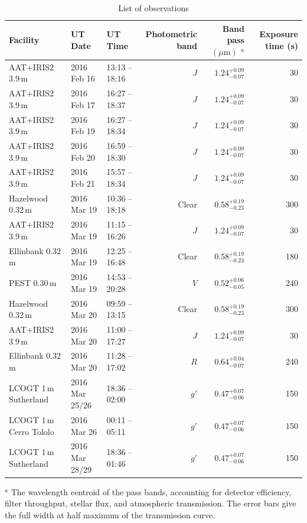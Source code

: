 \documentclass[useAMS,usenatbib]{mn2e}
\begin{document}
\begin{table}
\centering
\caption{\label{tab:observations}List of observations}
\begin{tabular}{lllrrr}
\hline\hline
Facility & UT Date & UT Time & Photometric band & Band pass $(\mu\mathrm{m})$ $^a$& Exposure time (s) \\
\hline
AAT+IRIS2 3.9\,m & 2016 Feb 16 & 13:13 -- 18:16 & $J$ & $1.24_{-0.07}^{+0.09}$ & 30 \\
AAT+IRIS2 3.9\,m & 2016 Feb 17 & 16:27 -- 18:37 & $J$ & $1.24_{-0.07}^{+0.09}$ & 30 \\
AAT+IRIS2 3.9\,m & 2016 Feb 19 & 16:27 -- 18:34 & $J$ & $1.24_{-0.07}^{+0.09}$ & 30 \\
AAT+IRIS2 3.9\,m & 2016 Feb 20 & 16:59 -- 18:30 & $J$ & $1.24_{-0.07}^{+0.09}$ & 30 \\
AAT+IRIS2 3.9\,m & 2016 Feb 21 & 15:57 -- 18:34 & $J$ & $1.24_{-0.07}^{+0.09}$ & 30 \\
Hazelwood 0.32\,m & 2016 Mar 19 & 10:36 -- 18:18 & Clear & $0.58_{-0.23}^{+0.19}$ & 300 \\
AAT+IRIS2 3.9\,m & 2016 Mar 19 & 11:15 -- 16:26 & $J$ & $1.24_{-0.07}^{+0.09}$ & 30 \\
Ellinbank 0.32\,m & 2016 Mar 19 & 12:25 -- 16:48 & Clear & $0.58_{-0.23}^{+0.19}$ & 180 \\
PEST 0.30\,m & 2016 Mar 19 & 14:53 -- 20:28 & $V$ & $0.52_{-0.05}^{+0.06}$ & 240 \\
Hazelwood 0.32\,m & 2016 Mar 20 & 09:59 -- 13:15 & Clear & $0.58_{-0.23}^{+0.19}$ & 300 \\
AAT+IRIS2 3.9\,m & 2016 Mar 20 & 11:00 -- 17:27 & $J$ & $1.24_{-0.07}^{+0.09}$ & 30 \\
Ellinbank 0.32\,m & 2016 Mar 20 & 11:28 -- 17:02 & $R$ & $0.64_{-0.07}^{+0.04}$ & 240 \\
LCOGT 1\,m Sutherland & 2016 Mar 25/26 & 18:36 -- 02:00 & $g'$ & $0.47_{-0.06}^{+0.07}$ & 150 \\
LCOGT 1\,m Cerro Tololo & 2016 Mar 26 & 00:11 -- 05:11 & $g'$ & $0.47_{-0.06}^{+0.07}$ & 150 \\
LCOGT 1\,m Sutherland & 2016 Mar 28/29 & 18:36 -- 01:46 & $g'$ & $0.47_{-0.06}^{+0.07}$ & 150 \\
\hline
\end{tabular}
\begin{flushleft}
    $^a$ The wavelength centroid of the pass bands, accounting for detector efficiency, filter throughput, stellar flux, and atmospheric transmission. The error bars give the full width at half maximum of the transmission curve.\\
\end{flushleft}
\end{table}
\end{document}
